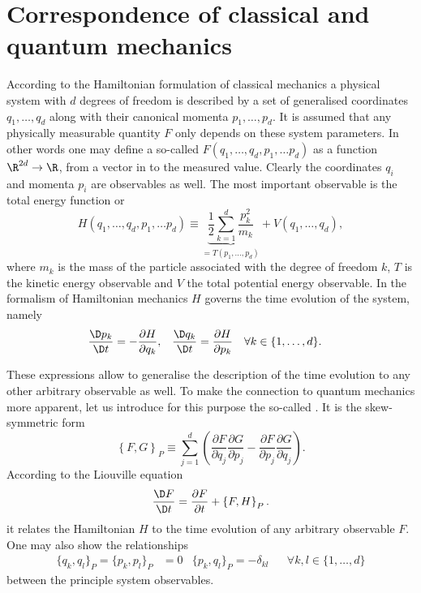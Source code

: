\section{Correspondence of classical and quantum mechanics}
\newcommand{\clphase}{(q_1, \ldots, q_d, p_1, \ldots p_d)}
%
According to the Hamiltonian formulation of classical mechanics
a physical system with $d$ degrees of freedom
is described by a set of generalised coordinates
$q_1, \ldots, q_d$ along with their canonical momenta $p_1, \ldots, p_d$.
It is assumed that any physically measurable quantity $F$
only depends on these system parameters.
In other words one may define a so-called 
$F\clphase$ as a function $\R^{2d} \to \R$, \ie
from a vector in  to the measured value.
Clearly the coordinates $q_i$ and momenta $p_i$ are observables as well.
The most important observable is the total energy function or 
\begin{equation}
	H\clphase
	\equiv \underbrace{\frac{1}{2} \sum_{k=1}^d \frac{p_k^2}{m_k}}_{= T(p_1, \ldots, p_d)}
	+ V(q_1, \ldots, q_d),
	\label{eqn:HamiltonianClassical}
\end{equation}
where $m_k$ is the mass of the particle associated with
the degree of freedom $k$,
$T$ is the kinetic energy observable and $V$ the total potential energy observable.
In the formalism of Hamiltonian mechanics $H$ governs the time evolution
of the system, namely
\begin{align}
	\frac{\D p_k}{\D t} &= - \frac{\partial H}{\partial q_k}, &
	\frac{\D q_k}{\D t} &= \frac{\partial H}{\partial p_k}
	&&\forall k \in \{1, \ldots, d\}.
	\label{eqn:HamiltonianEqnMotion}
\end{align}

These expressions allow to generalise the description of the time evolution
to any other arbitrary observable as well.
To make the connection to quantum mechanics more apparent,
let us introduce for this purpose the so-called .
It is the skew-symmetric form
\begin{equation}
	\left\{ F, G \right\}_P \equiv \sum_{j=1}^d \left(
	\frac{\partial  F}{\partial q_j} \frac{\partial G}{\partial p_j}
	- \frac{\partial  F}{\partial p_j} \frac{\partial G}{\partial q_j}
	\right).
	\label{eqn:PoissonBracket}
\end{equation}
According to the Liouville equation
\begin{equation}
	\frac{\D F}{\D t} = \frac{\partial F}{\partial t} + \left\{ F, H \right\}_P.
	\label{eqn:PoissonTimeEvolution}
\end{equation}
it relates the Hamiltonian $H$ to the time evolution of any arbitrary observable $F$.
One may also show the relationships
\begin{align}
	\{ q_k, q_l \}_P = \{p_k, p_l\}_P &= 0 & \{ p_k, q_l\}_P
	= - \delta_{kl} &&\forall k,l \in \{1, \ldots, d\}
	\label{eqn:PoissonProperties}
\end{align}
between the principle system observables.

